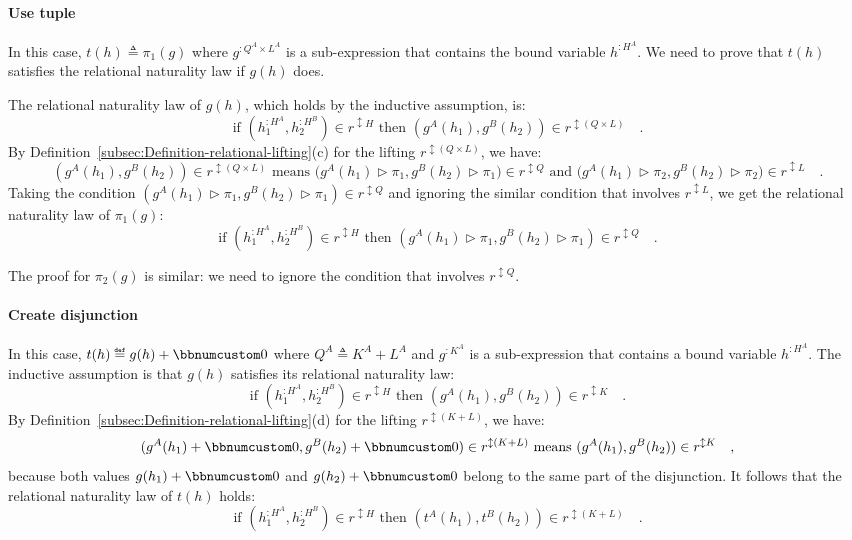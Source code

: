 \paragraph{Use tuple}

In this case, $t(h)\triangleq\pi_{1}(g)$ where $g^{:Q^{A}\times L^{A}}$
is a sub-expression that contains the bound variable $h^{:H^{A}}$.
We need to prove that $t(h)$ satisfies the relational naturality
law if $g(h)$ does.

The relational naturality law of $g(h)$, which holds by the inductive
assumption, is:
\[
\text{if }(h_{1}^{:H^{A}},h_{2}^{:H^{B}})\in r^{\updownarrow H}\text{ then }(g^{A}(h_{1}),g^{B}(h_{2}))\in r^{\updownarrow(Q\times L)}\quad.
\]
By Definition~\ref{subsec:Definition-relational-lifting}(c) for
the lifting $r^{\updownarrow(Q\times L)}$, we have:
\[
(g^{A}(h_{1}),g^{B}(h_{2}))\in r^{\updownarrow(Q\times L)}\text{ means }\big(g^{A}(h_{1})\triangleright\pi_{1},g^{B}(h_{2})\triangleright\pi_{1}\big)\in r^{\updownarrow Q}\text{ and }\big(g^{A}(h_{1})\triangleright\pi_{2},g^{B}(h_{2})\triangleright\pi_{2}\big)\in r^{\updownarrow L}\quad.
\]
Taking the condition $(g^{A}(h_{1})\triangleright\pi_{1},g^{B}(h_{2})\triangleright\pi_{1})\in r^{\updownarrow Q}$
and ignoring the similar condition that involves $r^{\updownarrow L}$,
we get the relational naturality law of $\pi_{1}(g)$:
\[
\text{if }(h_{1}^{:H^{A}},h_{2}^{:H^{B}})\in r^{\updownarrow H}\text{ then }(g^{A}(h_{1})\triangleright\pi_{1},g^{B}(h_{2})\triangleright\pi_{1})\in r^{\updownarrow Q}\quad.
\]

The proof for $\pi_{2}(g)$ is similar: we need to ignore the condition
that involves $r^{\updownarrow Q}$.

\paragraph{Create disjunction}

In this case, $t(h)\triangleq g(h)+\bbnum 0$ where $Q^{A}\triangleq K^{A}+L^{A}$
and $g^{:K^{A}}$ is a sub-expression that contains a bound variable
$h^{:H^{A}}$. The inductive assumption is that $g(h)$ satisfies
its relational naturality law:
\[
\text{if }(h_{1}^{:H^{A}},h_{2}^{:H^{B}})\in r^{\updownarrow H}\text{ then }(g^{A}(h_{1}),g^{B}(h_{2}))\in r^{\updownarrow K}\quad.
\]
By Definition~\ref{subsec:Definition-relational-lifting}(d) for
the lifting $r^{\updownarrow(K+L)}$, we have:
\[
(g^{A}(h_{1})+\bbnum 0,g^{B}(h_{2})+\bbnum 0)\in r^{\updownarrow(K+L)}\text{ means }(g^{A}(h_{1}),g^{B}(h_{2}))\in r^{\updownarrow K}\quad,
\]
because both values $g(h_{1})+\bbnum 0$ and $g(h_{2})+\bbnum 0$
belong to the same part of the disjunction. It follows that the relational
naturality law of $t(h)$ holds:
\[
\text{if }(h_{1}^{:H^{A}},h_{2}^{:H^{B}})\in r^{\updownarrow H}\text{ then }(t^{A}(h_{1}),t^{B}(h_{2}))\in r^{\updownarrow(K+L)}\quad.
\]



